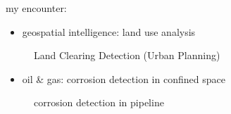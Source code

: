 \documentclass[
  paper=6in:9in,
  pagesize=pdftex,
  headinclude=on,
  footinclude=on,
  12pt]{scrbook}
\providecommand{\tightlist}{%
  \setlength{\itemsep}{0pt}\setlength{\parskip}{0pt}}\usepackage{longtable,booktabs,array}
\begin{document}
my encounter:

\begin{itemize}
\tightlist
\item
  geospatial intelligence: land use analysis
\end{itemize}

\begin{figure}[H]


\caption{\label{fig-geo}Land Clearing Detection (Urban Planning)}

\end{figure}%

\begin{itemize}
\tightlist
\item
  oil \& gas: corrosion detection in confined space
\end{itemize}

\begin{figure}[H]


\caption{\label{fig-karat}corrosion detection in pipeline}

\end{figure}%
\end{document}
